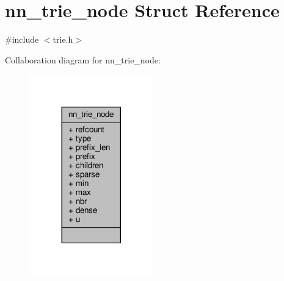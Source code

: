 \hypertarget{structnn__trie__node}{}\section{nn\+\_\+trie\+\_\+node Struct Reference}
\label{structnn__trie__node}


{\ttfamily \#include $<$trie.\+h$>$}



Collaboration diagram for nn\+\_\+trie\+\_\+node\+:\nopagebreak
\begin{figure}[H]
\begin{center}
\leavevmode
\includegraphics[width=152pt]{structnn__trie__node__coll__graph}
\end{center}
\end{figure}
